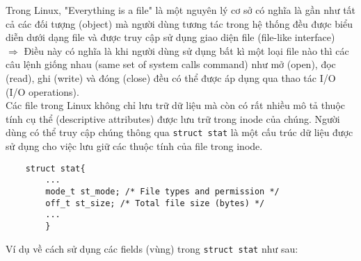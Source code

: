 \documentclass{article}
\begin{document}
Trong Linux, "Everything is a file" là một nguyên lý cơ sở có nghĩa là gần như tất cả các đối tượng (object) mà người dùng tương tác trong hệ thống đều được biểu diễn dưới dạng file và được truy cập sử dụng giao diện file (file-like interface)
\\ $\Rightarrow$ Điều này có nghĩa là khi người dùng sử dụng bất kì một loại file nào thì các câu lệnh giống nhau (same set of system calls command) như mở (open), đọc (read), ghi (write) và đóng (close) đều có thể được áp dụng qua thao tác I/O (I/O operations).
\\ Các file trong Linux không chỉ lưu trữ dữ liệu mà còn có rất nhiều mô tả thuộc tính cụ thể (descriptive attributes) được lưu trữ trong inode của chúng. Người dùng có thể truy cập chúng thông qua
\verb|struct stat| là một cấu trúc dữ liệu được sử dụng cho việc lưu giữ các thuộc tính của file trong inode.
\begin{verbatim}
    struct stat{
        ...
        mode_t st_mode; /* File types and permission */
        off_t st_size; /* Total file size (bytes) */
        ...
        }
\end{verbatim}
Ví dụ về cách sử dụng các fields (vùng) trong \verb|struct stat| như sau:
\end{document}
